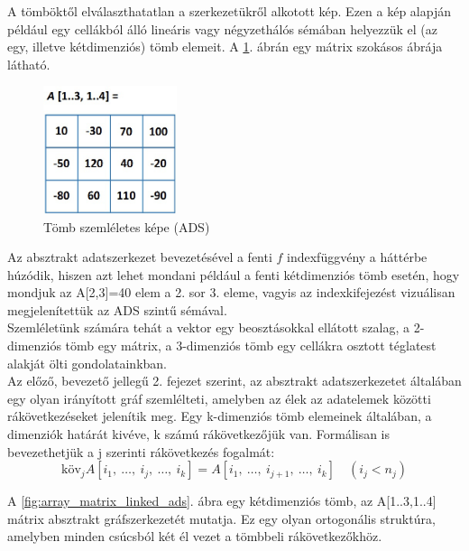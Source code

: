 \documentclass[12pt,margin=0px]{article}
\begin{document}
    \noindent A tömböktől elválaszthatatlan a szerkezetükről alkotott kép. Ezen a kép alapján például egy cellákból álló lineáris vagy négyzethálós sémában helyezzük el (az egy, illetve kétdimenziós) tömb elemeit. A \ref{fig:array_matrix_ads}. ábrán egy mátrix szokásos ábrája látható.

	\begin{figure}[H]
		\centering
		\includegraphics[width=0.35\textwidth]{img/array_matrix_ads.png}
		\caption{Tömb szemléletes képe (ADS)}
        \label{fig:array_matrix_ads}
	\end{figure}

    \noindent Az absztrakt adatszerkezet bevezetésével a fenti $f$ indexfüggvény a háttérbe húzódik, hiszen azt lehet mondani például a fenti kétdimenziós tömb esetén, hogy mondjuk az A[2,3]=40 elem a 2. sor 3. eleme, vagyis az indexkifejezést vizuálisan megjelenítettük az ADS szintű sémával.\\

    \noindent Szemléletünk számára tehát a vektor egy beosztásokkal ellátott szalag, a 2-dimenziós tömb egy mátrix, a 3-dimenziós tömb egy cellákra osztott téglatest alakját ölti gondolatainkban.\\

    \noindent Az előző, bevezető jellegű 2. fejezet szerint, az absztrakt adatszerkezetet általában egy olyan irányított gráf szemlélteti, amelyben az élek az adatelemek közötti rákövetkezéseket jelenítik meg. Egy k-dimenziós tömb elemeinek általában, a dimenziók határát kivéve, k számú rákövetkezőjük van. Formálisan is bevezethetjük a j szerinti rákövetkezés fogalmát:
    \[
        \text{köv}_{j}A\left[i_1,\ \ldots,\ i_j,\ \ldots,\ i_k\right] = A\left[i_1,\ \ldots,\ i_{j+1},\ \ldots,\ i_k\right]\quad (i_j < n_j)
    \]

    \noindent A \ref{fig:array_matrix_linked_ads}. ábra egy kétdimenziós tömb, az A[1..3,1..4] mátrix absztrakt gráfszerkezetét mutatja. Ez egy olyan ortogonális struktúra, amelyben minden csúcsból két él vezet a tömbbeli rákövetkezőkhöz.
\end{document}

